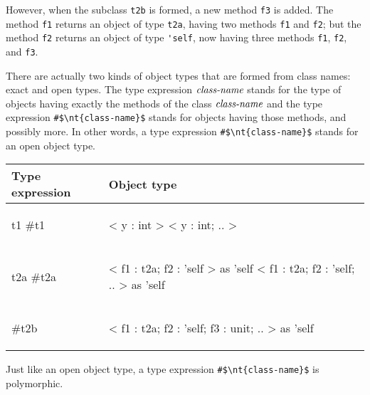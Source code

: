 However, when the subclass \hbox{\lstinline/t2b/} is formed, a new method \hbox{\lstinline/f3/} is added.  The
method \hbox{\lstinline/f1/} returns an object of type \hbox{\lstinline/t2a/}, having two methods \hbox{\lstinline/f1/}
and \hbox{\lstinline/f2/}; but the method \hbox{\lstinline/f2/} returns an object of type \hbox{\lstinline/'self/},
now having three methods \hbox{\lstinline/f1/}, \hbox{\lstinline/f2/}, and \hbox{\lstinline/f3/}.

\label{keyword:hash-class}
There are actually two kinds of object types that are formed from class names: exact and open types.
The type expression $\textit{\rmfamily class-name}$ stands for the type of objects having exactly the
methods of the class $\textit{\rmfamily class-name}$ and the type expression \hbox{\lstinline/#$\nt{class-name}$/}
stands for objects having those methods, and possibly more.  In other words, a type expression
\hbox{\lstinline/#$\nt{class-name}$/} stands for an open object type.

\begin{center}
\begin{tabular}{ll}
Type expression & Object type\\
\hline
\begin{minipage}[t]{2in}
\begin{ocamllisting}
t1
#t1
\end{ocamllisting}
\end{minipage}
&
\begin{minipage}[t]{2in}
\begin{ocamllisting}
< y : int >
< y : int; .. >
\end{ocamllisting}
\end{minipage}
\\
\begin{minipage}[t]{2in}
\begin{ocamllisting}
t2a
#t2a
\end{ocamllisting}
\end{minipage}
&
\begin{minipage}[t]{2in}
\begin{ocamllisting}
< f1 : t2a; f2 : 'self > as 'self
< f1 : t2a; f2 : 'self; .. > as 'self
\end{ocamllisting}
\end{minipage}
\\
\begin{minipage}[t]{2in}
\begin{ocamllisting}
#t2b
\end{ocamllisting}
\end{minipage}
&
\begin{minipage}[t]{2in}
\begin{ocamllisting}
< f1 : t2a;
  f2 : 'self;
  f3 : unit;
  .. > as 'self
\end{ocamllisting}
\end{minipage}
\end{tabular}
\end{center}
%
Just like an open object type, a type expression \hbox{\lstinline/#$\nt{class-name}$/} is polymorphic.

